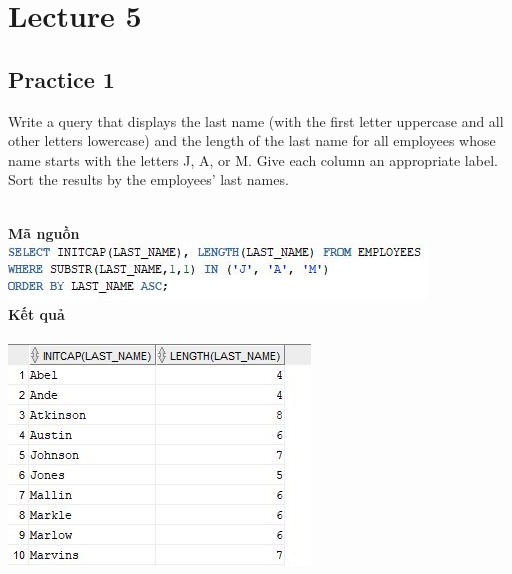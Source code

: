 \documentclass[12pt,a4paper]{report}
\begin{document}
\section{Lecture 5}
\subsection{Practice 1}
\begin{boxedminipage}[t]{15.5cm}
	Write a query that displays the last name (with the first letter uppercase and all other letters lowercase) 
	and the length of the last name for all employees whose name starts with the letters J, A, or M. 
	Give each column an appropriate label. Sort the results by the employees’ last names.
\end{boxedminipage}
\newline
\\
\textbf{Mã nguồn}
\\
\newline
\includegraphics[scale=1]{15.jpg}\\
\textbf{Kết quả}\\\\
\includegraphics[scale=1]{k15.jpg}
\end{document}
